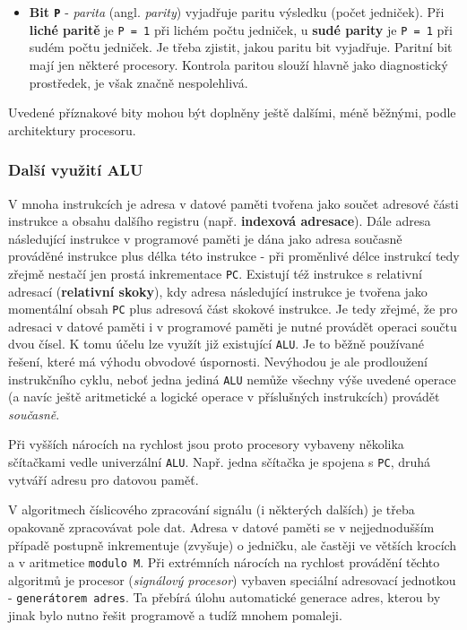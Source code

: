 \begin{itemize}[noitemsep]
          \item \textbf{Bit \texttt{P}} - \emph{parita} (angl. \emph{parity}) vyjadřuje paritu     
                výsledku (počet jedniček). Při \textbf{liché paritě} je \texttt{P = 1} při lichém 
                počtu jedniček, u \textbf{sudé parity} je \texttt{P = 1} při sudém počtu jedniček. 
                Je třeba zjistit, jakou paritu bit vyjadřuje. Paritní bit mají jen některé 
                procesory. Kontrola paritou slouží hlavně jako diagnostický prostředek, je však 
                značně nespolehlivá. 
        \end{itemize}        
        
        Uvedené příznakové bity mohou být doplněny ještě dalšími, méně běžnými, podle architektury
        procesoru.
      
      \subsubsection{Další využití ALU}
        V mnoha instrukcích je adresa v datové paměti tvořena jako součet adresové části instrukce 
        a obsahu dalšího registru (např. \textbf{indexová adresace}). Dále adresa následující 
        instrukce v programové paměti je dána jako adresa současně prováděné instrukce plus délka 
        této instrukce - při proměnlivé délce instrukcí tedy zřejmě nestačí jen prostá inkrementace 
        \texttt{PC}. Existují též instrukce s relativní adresací (\textbf{relativní skoky}), kdy 
        adresa následující instrukce je tvořena jako momentální obsah \texttt{PC} plus adresová 
        část skokové instrukce. Je tedy zřejmé, že pro adresaci v datové paměti i v programové 
        paměti je nutné provádět operaci součtu dvou čísel. K tomu účelu lze využít již existující 
        \texttt{ALU}. Je to běžně používané řešení, které má výhodu obvodové úspornosti. Nevýhodou 
        je ale prodloužení instrukčního cyklu, neboť jedna jediná \texttt{ALU} nemůže  všechny výše 
        uvedené operace (a navíc ještě aritmetické a logické operace v příslušných instrukcích) 
        provádět \emph{současně}.
        
        Při vyšších nárocích na rychlost jsou proto procesory vybaveny několika sčítačkami vedle 
        univerzální \texttt{ALU}. Např. jedna sčítačka je spojena s \texttt{PC}, druhá vytváří 
        adresu pro datovou paměť.
        
        V algoritmech číslicového zpracování signálu (i některých dalších) je třeba opakovaně 
        zpracovávat pole dat. Adresa v datové paměti se v nejjednodušším případě postupně 
        inkrementuje (zvyšuje) o jedničku, ale častěji ve větších krocích a v aritmetice 
        \texttt{modulo M}. Při extrémních nárocích na rychlost provádění těchto algoritmů je 
        procesor (\emph{signálový procesor}) vybaven speciální adresovací jednotkou - 
        \texttt{generátorem adres}. Ta přebírá úlohu automatické generace adres, kterou by jinak 
        bylo nutno řešit programově a tudíž mnohem pomaleji.
      
